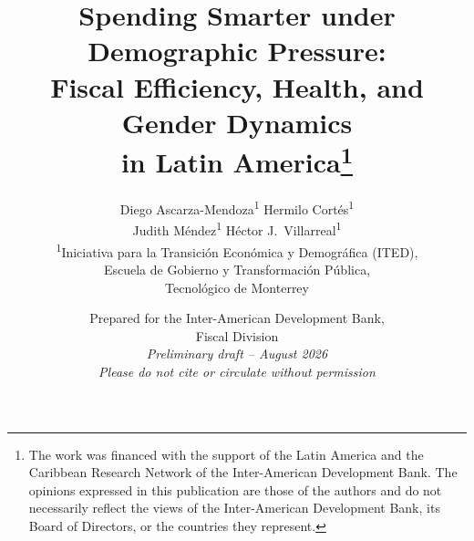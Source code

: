 \documentclass[12pt,a4paper]{article}
\begin{document}
\title{\textbf{Spending Smarter under Demographic Pressure:}\\[6pt]
Fiscal Efficiency, Health, and Gender Dynamics\\
in Latin America\thanks{The work was financed with the support of the Latin America and the Caribbean Research Network of the Inter-American Development Bank. The opinions expressed in this publication are those of the authors and do not necessarily reflect the views of the Inter-American Development Bank, its Board of Directors, or the countries they represent.}}

\author{
Diego Ascarza-Mendoza\textsuperscript{1} \quad Hermilo Cort\'es\textsuperscript{1}\\[3pt]
Judith M\'endez\textsuperscript{1} \quad H\'ector J.\ Villarreal\textsuperscript{1}
\\[6pt]
\textsuperscript{1}Iniciativa para la Transici\'on Econ\'omica y Demogr\'afica (ITED),\\
Escuela de Gobierno y Transformaci\'on P\'ublica,\\
Tecnol\'ogico de Monterrey
}

\date{%
Prepared for the Inter-American Development Bank,\\
Fiscal Division\\[12pt]
\textit{Preliminary draft -- August 2026}\\
\textit{Please do not cite or circulate without permission}
}

\maketitle
\end{document}
